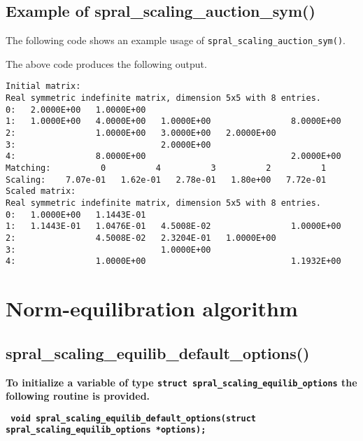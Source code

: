 \subsection{Example of spral\_scaling\_auction\_sym()}
The following code shows an example usage of \texttt{spral\_scaling\_auction\_sym()}.

\newpage
The above code produces the following output.
\begin{verbatim}
Initial matrix:
Real symmetric indefinite matrix, dimension 5x5 with 8 entries.
0:   2.0000E+00   1.0000E+00                                       
1:   1.0000E+00   4.0000E+00   1.0000E+00                8.0000E+00
2:                1.0000E+00   3.0000E+00   2.0000E+00             
3:                             2.0000E+00                          
4:                8.0000E+00                             2.0000E+00
Matching:          0          4          3          2          1
Scaling:    7.07e-01   1.62e-01   2.78e-01   1.80e+00   7.72e-01
Scaled matrix:
Real symmetric indefinite matrix, dimension 5x5 with 8 entries.
0:   1.0000E+00   1.1443E-01                                       
1:   1.1443E-01   1.0476E-01   4.5008E-02                1.0000E+00
2:                4.5008E-02   2.3204E-01   1.0000E+00             
3:                             1.0000E+00                          
4:                1.0000E+00                             1.1932E+00
\end{verbatim}


\section{Norm-equilibration algorithm}

\subsection{spral\_scaling\_equilib\_default\_options()}

\textbf{To initialize a variable of type
   \texttt{struct spral\_scaling\_equilib\_options} the following routine
   is provided.}

\vspace*{0.3cm}
\noindent
\textbf{\texttt{
   \hspace*{0.3cm} void spral\_scaling\_equilib\_default\_options(struct spral\_scaling\_equilib\_options *options);
}}
\vspace*{-0.4cm}

